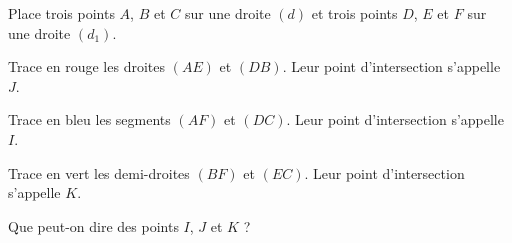 Place trois points $A$, $B$ et $C$ sur une droite $(d)$ et trois
points $D$, $E$ et $F$ sur une droite $(d_1)$.
\begin{myenumerate}
\item Trace en rouge les droites $(AE)$ et $(DB)$. Leur point
d'intersection s'appelle $J$.
\item Trace en bleu les segments $(AF)$ et $(DC)$. Leur point
d'intersection s'appelle $I$.
\item Trace en vert les demi-droites $(BF)$ et $(EC)$. Leur point
d'intersection s'appelle $K$.
\item Que peut-on dire des points $I$, $J$ et $K$ ?
\end{myenumerate}